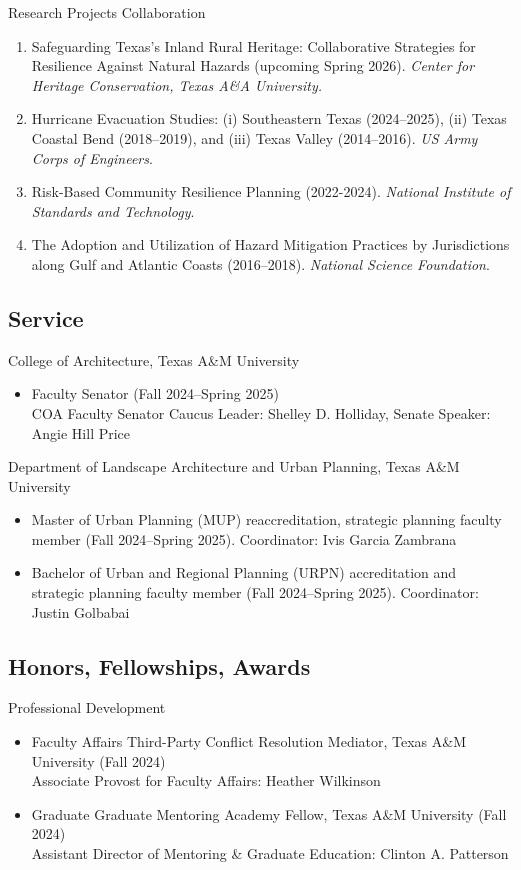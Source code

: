 \documentclass[11pt,oneside]{article}
\begin{document}
\vspace{1pt}

{Research Projects Collaboration}
\begin{enumerate}[leftmargin=20pt]
\item Safeguarding Texas's Inland Rural Heritage: Collaborative Strategies for Resilience Against Natural Hazards (upcoming Spring 2026). \emph{Center for Heritage Conservation, Texas A\&A University.}
\item Hurricane Evacuation Studies: (i) Southeastern Texas (2024--2025), (ii) Texas Coastal Bend (2018--2019), and (iii) Texas Valley (2014--2016). \emph{US Army Corps of Engineers}.
\item Risk-Based Community Resilience Planning (2022-2024). \emph{National Institute of Standards and Technology}.
\item The Adoption and Utilization of Hazard Mitigation Practices by Jurisdictions along Gulf and Atlantic Coasts (2016--2018). \emph{National Science Foundation}.
\end{enumerate}

\subsection*{Service}
College of Architecture, Texas A\&M University
\begin{itemize}[leftmargin=20pt]
\item Faculty Senator (Fall 2024--Spring 2025)\\
      COA Faculty Senator Caucus Leader: Shelley D. Holliday, Senate Speaker: Angie Hill Price
\end{itemize}
Department of Landscape Architecture and Urban Planning, Texas A\&M University
\begin{itemize}[leftmargin=20pt]
\item Master of Urban Planning (MUP) reaccreditation, strategic planning faculty member (Fall 2024--Spring 2025).
      Coordinator: Ivis Garcia Zambrana
\item Bachelor of Urban and Regional Planning (URPN) accreditation and strategic planning faculty member (Fall 2024--Spring 2025).
      Coordinator: Justin Golbabai
\end{itemize}

\subsection*{Honors, Fellowships, Awards}

{Professional Development}
\begin{itemize}[leftmargin=20pt]
\item Faculty Affairs Third-Party Conflict Resolution Mediator, Texas A\&M University (Fall 2024)\\
      Associate Provost for Faculty Affairs: Heather Wilkinson
\item Graduate Graduate Mentoring Academy Fellow, Texas A\&M University (Fall 2024)\\
      Assistant Director of Mentoring \& Graduate Education: Clinton A. Patterson
\end{itemize}
\end{document}
